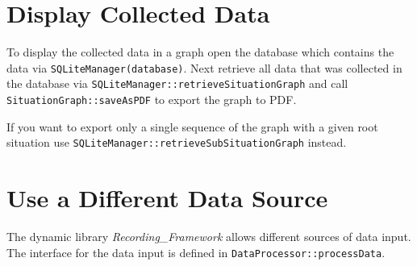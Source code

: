 \documentclass[a4paper, 11pt]{scrreprt}
\begin{document}
	\section{Display Collected Data}
	To display the collected data in a graph open the database which contains the data via \verb+SQLiteManager(database)+.
	Next retrieve all data that was collected in the database via \verb+SQLiteManager::retrieveSituationGraph+ and call \verb+SituationGraph::saveAsPDF+ to export the graph to PDF.
	
	If you want to export only a single sequence of the graph with a given root situation use \verb+SQLiteManager::retrieveSubSituationGraph+ instead.
	
	\section{Use a Different Data Source}
	The dynamic library \emph{Recording\_Framework} allows different sources of data input.
	The interface for the data input is defined in \verb+DataProcessor::processData+.
\end{document}

